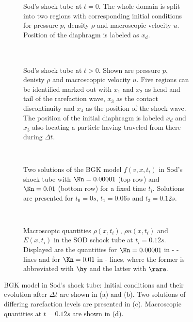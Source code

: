 \begin{figure}[H]
	\begin{subfigure}{.45\textwidth}
		\centering
		
		\caption{Sod's shock tube at \(t=0\). The whole domain is split into two regions with corresponding initial conditions for pressure \(p\), density \(\rho\) and macroscopic velocity \(u\). Position of the diaphragm is labeled as \(x_d\).\\ \\ \\}
		\label{Fig:SodTime}
	\end{subfigure}\hfill
	\begin{subfigure}{.45\textwidth}
		\centering
		
		\caption{Sod's shock tube at \(t>0\). Shown are pressure \(p\), denisty \(\rho\)  and macroscoppic velocity \(u\). Five regions can be identified marked out with \(x_1\) and \(x_2\) as head and tail of the rarefaction wave, \(x_3\) as the contact discontinuity and \(x_4\) as the position of the shock wave. The position of the initial diaphragm is labeled \(x_d\) and \(x_3\) also locating a particle having traveled from there during \(\Delta t\).}
		\label{Fig:SodTime0}
	\end{subfigure}\\ \vfill
	\begin{subfigure}{\textwidth}
		\centering
		
		\caption{Two solutions of the BGK model \(f(v,x,t_i)\) in Sod's shock tube with \(\Kn=0.00001\) (top row) and \(\Kn=0.01\) (bottom row) for a fixed time \(t_i\). Solutions are presented for \(t_0=0s\), \(t_1=0.06s\) and \(t_2=0.12s\).}
		\label{Fig:ExamplesSod}
	\end{subfigure}\\
	\begin{subfigure}{\textwidth}
		
		\caption{Macroscopic quantities \(\rho(x,t_i)\), \(\rho u(x,t_i)\) and \(E(x,t_i)\) in the SOD schock tube at \(t_i=0.12s\). Displayed are the quantities for \(\Kn=0.00001\)  in - - lines and for \(\Kn=0.01\) in - lines, where the former is abbreviated with \(\hy\) and the latter with \(\rare\).}
		\label{Fig:SODHyRare}
	\end{subfigure}\caption{BGK model in Sod's shock tube: Initial conditions and their evolution after \(\Delta t\) are shown in (a) and (b). Two solutions of differing rarefaction levels are presented in (c). Macroscopic quantities at \(t=0.12s\) are shown in (d).}
	\label{Fig:Sod}
\end{figure}

